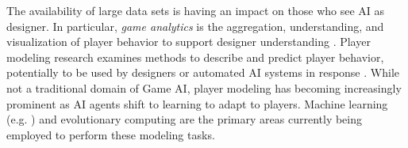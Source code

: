 \documentclass[conference]{IEEEtran}
\newcommand{\mytodo}[1]{\textbf{[[#1]]}}
\begin{document}
The availability of large data sets is having an impact on those who see AI as designer.
In particular, {\em game analytics} is the aggregation, understanding, and visualization of player behavior to support designer understanding \cite{seifel-nasr2013:game-analytics-book}. 
Player modeling research examines methods to describe and predict player behavior, potentially to be used by designers or automated AI systems in response \cite{smith2011:playermodel}. While not a traditional domain of Game AI, player modeling has becoming increasingly prominent as AI agents shift to learning to adapt to players. Machine learning (e.g. \cite{harrison2011:wow-seq-pred, weber2011:playermodel}) and evolutionary computing \cite{yannakakis2011:edpcg} are the primary areas currently being employed to perform these modeling tasks.


\end{document}
